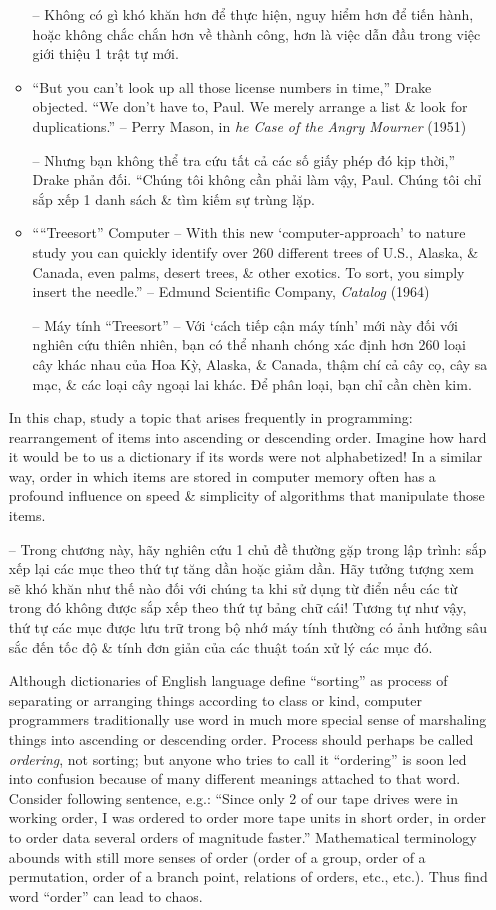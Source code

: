 \documentclass{article}
\begin{document}
\begin{itemize}
\begin{itemize}
        -- Không có gì khó khăn hơn để thực hiện, nguy hiểm hơn để tiến hành, hoặc không chắc chắn hơn về thành công, hơn là việc dẫn đầu trong việc giới thiệu 1 trật tự mới.
        \item ``But you can't look up all those license numbers in time,'' Drake objected. ``We don't have to, Paul. We merely arrange a list \& look for duplications.'' -- {\sc Perry Mason}, in {\it he Case of the Angry Mourner} (1951)
        
        -- Nhưng bạn không thể tra cứu tất cả các số giấy phép đó kịp thời,'' Drake phản đối. ``Chúng tôi không cần phải làm vậy, Paul. Chúng tôi chỉ sắp xếp 1 danh sách \& tìm kiếm sự trùng lặp.
        \item ````Treesort'' Computer -- With this new `computer-approach' to nature study you can quickly identify over 260 different trees of U.S., Alaska, \& Canada, even palms, desert trees, \& other exotics. To sort, you simply insert the needle.'' -- {\sc Edmund Scientific Company}, {\it Catalog} (1964)
        
        -- Máy tính ``Treesort'' -- Với `cách tiếp cận máy tính' mới này đối với nghiên cứu thiên nhiên, bạn có thể nhanh chóng xác định hơn 260 loại cây khác nhau của Hoa Kỳ, Alaska, \& Canada, thậm chí cả cây cọ, cây sa mạc, \& các loại cây ngoại lai khác. Để phân loại, bạn chỉ cần chèn kim.
    \end{itemize}
    In this chap, study a topic that arises frequently in programming: rearrangement of items into ascending or descending order. Imagine how hard it would be to us a dictionary if its words were not alphabetized! In a similar way, order in which items are stored in computer memory often has a profound influence on speed \& simplicity of algorithms that manipulate those items.
    
    -- Trong chương này, hãy nghiên cứu 1 chủ đề thường gặp trong lập trình: sắp xếp lại các mục theo thứ tự tăng dần hoặc giảm dần. Hãy tưởng tượng xem sẽ khó khăn như thế nào đối với chúng ta khi sử dụng từ điển nếu các từ trong đó không được sắp xếp theo thứ tự bảng chữ cái! Tương tự như vậy, thứ tự các mục được lưu trữ trong bộ nhớ máy tính thường có ảnh hưởng sâu sắc đến tốc độ \& tính đơn giản của các thuật toán xử lý các mục đó.
    
    Although dictionaries of English language define ``sorting'' as process of separating or arranging things according to class or kind, computer programmers traditionally use word in much more special sense of marshaling things into ascending or descending order. Process should perhaps be called {\it ordering}, not sorting; but anyone who tries to call it ``ordering'' is soon led into confusion because of many different meanings attached to that word. Consider following sentence, e.g.: ``Since only 2 of our tape drives were in working order, I was ordered to order more tape units in short order, in order to order data several orders of magnitude faster.'' Mathematical terminology abounds with still more senses of order (order of a group, order of a permutation, order of a branch point, relations of orders, etc., etc.). Thus find word ``order'' can lead to chaos.
    

\end{itemize}
\end{document}
